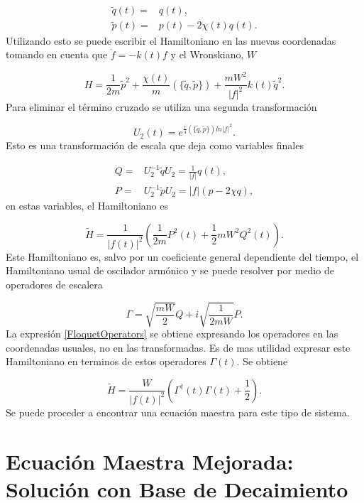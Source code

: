 \documentclass[a4paper,10pt]{report}
\begin{document}
\begin{align}
\tilde{q}(t)=&q(t),\\
\tilde{p}(t)=&p(t)-2\chi(t)q(t).
\end{align}Utilizando esto se puede escribir el Hamiltoniano en las nuevas coordenadas tomando en cuenta que $\ddot{f}= -k(t)f$ y el Wronskiano, $W$

\begin{equation}
 H = \frac{1}{2m}\tilde{p}^2 + \frac{\chi(t)}{m}(\{\tilde{q},\tilde{p}\}) + \frac{mW^2}{|f|^2}k(t)\tilde{q}^2.
\end{equation}Para eliminar el término cruzado se utiliza una segunda transformación

\begin{equation}
U_2(t)=e^{\frac{i}{4}(\{\tilde{q},\tilde{p}\})ln|f|^2}.
\end{equation}Esto es una transformación de escala que deja como variables finales

\begin{align}
Q=&U_2^{-1}\tilde{q}U_2 =\frac{1}{|f|}q(t),\\
P=&U_2^{-1}\tilde{p}U_2 = |f|(p-2\chi q), 
\end{align} en estas variables, el Hamiltoniano es

\begin{equation}\label{QTDHO}
\tilde{H} = \frac{1}{|f(t)|^2}(\frac{1}{2m}P^2(t)+\frac{1}{2}mW^2Q^2(t)).
\end{equation}Este Hamiltoniano es, salvo por un coeficiente general dependiente del tiempo, el Hamiltoniano usual de oscilador armónico y se puede resolver por medio de operadores de escalera

\begin{equation}
\Gamma = \sqrt{\frac{mW}{2}}Q + i \sqrt{\frac{1}{2mW}}P.
\end{equation} La expresión \eqref{FloquetOperators} se obtiene expresando los operadores en las coordenadas usuales, no en las transformadas. Es de mas utilidad expresar este Hamiltoniano en terminos de estos operadores $\Gamma(t)$. Se obtiene

\begin{equation}
\tilde{H} = \frac{W}{|f(t)|^2}(\Gamma^\dagger(t)\Gamma(t) + \frac{1}{2}).
\end{equation} Se puede proceder a encontrar una ecuación maestra para este tipo de sistema.

\section{Ecuación Maestra Mejorada: Solución con Base de Decaimiento}
\end{document}
